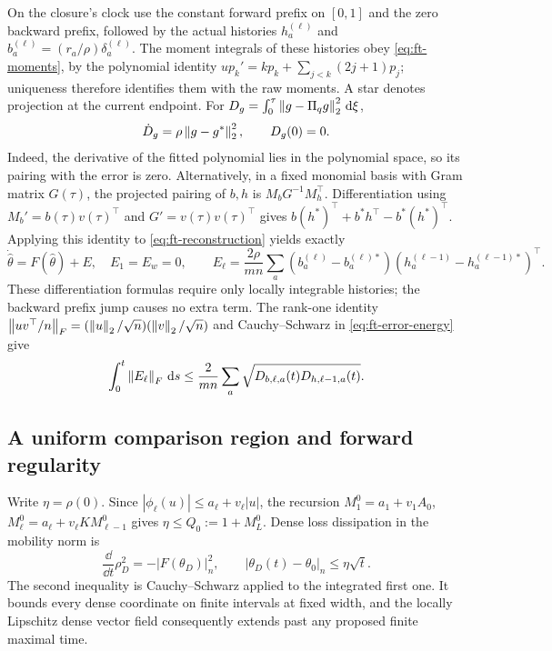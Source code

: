 On the closure's clock use the constant forward prefix on $[0,1]$ and
the zero backward prefix, followed by the actual histories
$h_a^{(\ell)}$ and $b_a^{(\ell)}=(r_a/\rho)\delta_a^{(\ell)}$.
The moment integrals of these histories obey \eqref{eq:ft-moments},
by the polynomial identity
$u p_k'=kp_k+\sum_{j<k}(2j+1)p_j$; uniqueness therefore identifies them
with the raw moments.  A star denotes projection at the current endpoint.
For $D_g=\int_0^\tau\left\lVert g-\Pi_qg\right\rVert_2^2\,\mathrm{d}\xi$,
\begin{equation}
 \dot D_g=\rho\left\lVert g-g^*\right\rVert_2^2,\qquad D_g(0)=0.
 \label{eq:ft-error-energy}
\end{equation}
Indeed, the derivative of the fitted polynomial lies in the polynomial
space, so its pairing with the error is zero.  Alternatively, in a fixed
monomial basis with Gram matrix $G(\tau)$, the projected pairing of
$b,h$ is $M_bG^{-1}M_h^\top$.  Differentiation using
$M_b'=b(\tau)v(\tau)^\top$ and $G'=v(\tau)v(\tau)^\top$ gives
$b(h^*)^\top+b^*h^\top-b^*(h^*)^\top$.  Applying this identity to
\eqref{eq:ft-reconstruction} yields exactly
\begin{equation}
 \dot{\widehat\theta}=F(\widehat\theta)+E,\quad E_1=E_w=0,
 \qquad E_\ell=\frac{2\rho}{mn}\sum_a
      (b_a^{(\ell)}-b_a^{(\ell)*})
      (h_a^{(\ell-1)}-h_a^{(\ell-1)*})^\top.
 \label{eq:ft-defect}
\end{equation}
These differentiation formulas require only locally integrable histories;
the backward prefix jump causes no extra term.  The rank-one identity
$\left\lVert uv^\top/n\right\rVert_F=(\left\lVert u\right\rVert_2/\sqrt n)(\left\lVert v\right\rVert_2/\sqrt n)$ and
Cauchy--Schwarz in \eqref{eq:ft-error-energy} give
\begin{equation}
 \int_0^t\left\lVert E_\ell\right\rVert_F\,\mathrm{d} s
 \le\frac{2}{mn}\sum_a\sqrt{D_{b,\ell,a}(t)D_{h,\ell-1,a}(t)}.
 \label{eq:ft-absolute-defect}
\end{equation}

\subsection*{A uniform comparison region and forward regularity}

Write $\eta=\rho(0)$.  Since $|\phi_\ell(u)|\le a_\ell+v_\ell|u|$,
the recursion $M_1^0=a_1+v_1A_0$,
$M_\ell^0=a_\ell+v_\ell K M_{\ell-1}^0$ gives
$\eta\le Q_0:=1+M_L^0$.  Dense loss dissipation in the mobility norm is
\[
 \frac{\dd}{\dd t}\rho_D^2=-|F(\theta_D)|_n^2,
 \qquad |\theta_D(t)-\theta_0|_n\le\eta\sqrt t.
\]
The second inequality is Cauchy--Schwarz applied to the integrated first
one.  It bounds every dense coordinate on finite intervals at fixed
width, and the locally Lipschitz dense vector field consequently extends
past any proposed finite maximal time.

